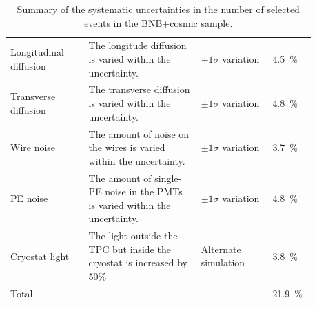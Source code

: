 \begin{table}[htbp]
\begin{tabular}{p{0.23\linewidth}p{0.33\linewidth}p{0.21\linewidth}p{0.11\linewidth}}
     Longitudinal diffusion & The longitude diffusion is varied within the uncertainty. & $\pm1\sigma$ variation & 4.5~\%\\
     Transverse diffusion & The transverse diffusion is varied within the uncertainty. & $\pm1\sigma$ variation & 4.8~\%\\
     Wire noise & The amount of noise on the wires is varied within the uncertainty. & $\pm1\sigma$ variation & 3.7~\%\\
     PE noise & The amount of single-PE noise in the PMTs is varied within the uncertainty. & $\pm1\sigma$ variation & 4.8~\%\\
     Cryostat light & The light outside the TPC but inside the cryostat is increased by 50\% & Alternate simulation & 3.8~\%\\
     \midrule
     Total & & & 21.9~\%\\
     \bottomrule
   \end{tabular}
   \caption{Summary of the systematic uncertainties in the number of selected events in the BNB+cosmic sample.}\label{tab:syst}
\end{table}
